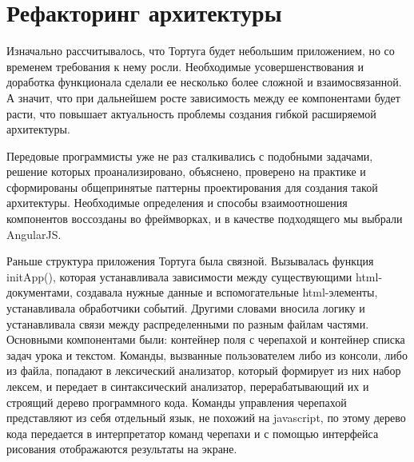 \section{Рефакторинг архитектуры} \label{sect1_1}
Изначально рассчитывалось, что Тортуга будет небольшим приложением, но со временем требования к нему росли. Необходимые усовершенствования и доработка функционала сделали ее несколько более сложной и взаимосвязанной. А значит, что при дальнейшем росте зависимость между ее компонентами будет расти, что повышает актуальность проблемы создания гибкой расширяемой архитектуры. 

Передовые программисты уже не раз сталкивались с подобными задачами, решение которых проанализировано, объяснено, проверено на практике и сформированы общепринятые паттерны проектирования для создания такой архитектуры. Необходимые определения и способы взаимоотношения компонентов воссозданы во фреймворках, и в качестве подходящего мы выбрали AngularJS.

Раньше структура приложения Тортуга была связной. Вызывалась функция initApp(), которая устанавливала зависимости между существующими html-документами, создавала нужные данные и вспомогательные html-элементы, устанавливала обработчики событий. Другими словами вносила логику и устанавливала связи между распределенными по разным файлам частями. Основными компонентами были: контейнер поля с черепахой и контейнер списка задач урока и текстом. Команды, вызванные пользователем либо из консоли, либо из файла, попадают в лексический анализатор, который формирует из них набор лексем, и передает в синтаксический анализатор, перерабатывающий их и строящий дерево программного кода. Команды управления черепахой представляют из себя отдельный язык, не похожий на javascript, по этому дерево кода передается в интерпретатор команд черепахи и с помощью интерфейса рисования отображаются результаты на экране.

